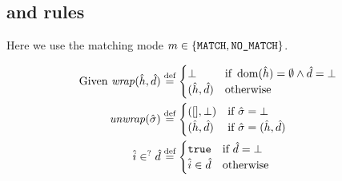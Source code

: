 \begin{mathpar}
\end{mathpar}

\subsection{ and  rules}

Here we use the matching mode $m\in\{\code{MATCH}, \code{NO\_MATCH}\}$.

\begin{align*}
	\text{Given }
	\fn{wrap}(\sym h, \sym d) &\defeq \begin{cases}
		\bot &\If~\dom(\sym h)=\emptyset \land \sym d=\bot\\
		(\sym h,\sym d)&\Otherwise
	\end{cases}\\
	\fn{unwrap}(\sst) & \defeq \begin{cases}
		([], \bot) &\If~\sst=\bot\\
		(\sym h, \sym d) &\If~\sst=(\sym h,\sym d)
	\end{cases}\\
	\sym i \in^? \sym d &\defeq \begin{cases}
		\vtrue &\If~\sym d =\bot\\
		\sym i\in \sym d&\Otherwise
	\end{cases}
\end{align*}
